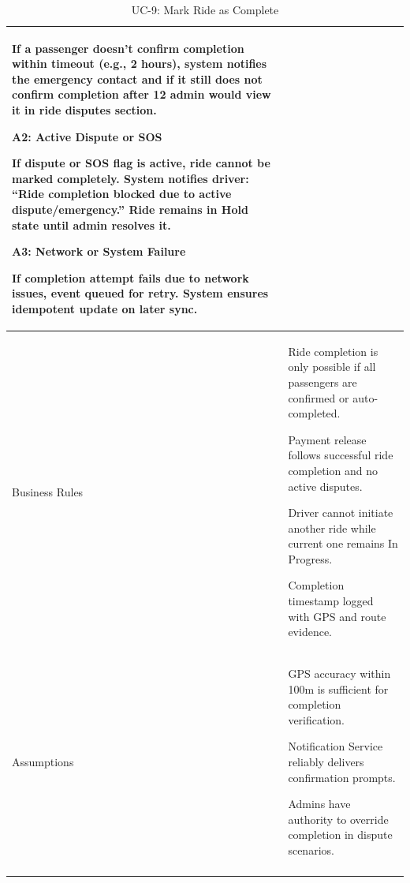 \begin{longtable}{|p{3.5cm}|p{12cm}|}
If a passenger doesn’t confirm completion within timeout (e.g., 2 hours), system notifies the emergency contact and if it still does not confirm completion after 12 admin would view it in ride disputes section.

\textbf{A2: Active Dispute or SOS}

If dispute or SOS flag is active, ride cannot be marked completely. System notifies driver: “Ride completion blocked due to active dispute/emergency.” Ride remains in Hold state until admin resolves it.

\textbf{A3: Network or System Failure}

If completion attempt fails due to network issues, event queued for retry. System ensures idempotent update on later sync. \\
\hline
Business Rules &
Ride completion is only possible if all passengers are confirmed or auto-completed.

Payment release follows successful ride completion and no active disputes.

Driver cannot initiate another ride while current one remains In Progress.

Completion timestamp logged with GPS and route evidence. \\
\hline
Assumptions &
GPS accuracy within 100m is sufficient for completion verification.

Notification Service reliably delivers confirmation prompts.

Admins have authority to override completion in dispute scenarios. \\
\hline
\caption{UC-9: Mark Ride as Complete}
\end{longtable}

